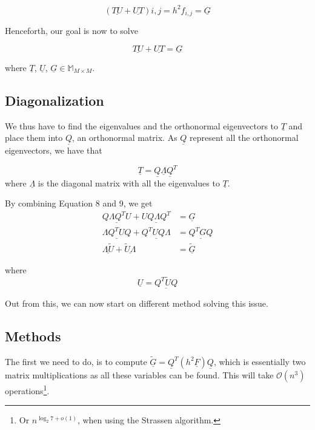 \begin{equation}
  (\underline{TU} + \underline{UT})i,j = h^2f_{i,j} = \underline{G}
\end{equation}

Henceforth, our goal is now to solve

\begin{equation}
  \underline{TU} + \underline{UT} = \underline G
\end{equation}

where $\underline T$, $\underline U$, $\underline G \in \mathbb{M}_{M\times M}$.

\subsection{Diagonalization}

We thus have to find the eigenvalues and the orthonormal eigenvectors to
$\underline T$ and place them into $\underline Q$, an orthonormal matrix. As
$\underline Q$ represent all the orthonormal eigenvectors, we have that

\begin{equation}
  \underline T = \underline Q \underline \Lambda \underline Q^T
\end{equation}
where $\underline \Lambda$ is the diagonal matrix with all the eigenvalues to
$\underline T$.

By combining Equation 8 and 9, we get
\begin{align}
  \underline {Q \Lambda Q^T U} + \underline {U Q \Lambda Q^T} &= \underline G \\
  \underline {\Lambda Q^T U Q} + \underline {Q^T U Q \Lambda} &= \underline{Q^T
    G Q} \\
  \underline {\Lambda \tilde{U}} + \underline {\tilde{U} \Lambda} &= \underline{\tilde{G}}
\end{align}

where
\begin{equation}
  \underline U = \underline{Q^T \tilde{U} Q}
\end{equation}

Out from this, we can now start on different method solving this issue.

\subsection{Methods}

The first we need to do, is to compute $\underline{\tilde{G}} = \underline Q^T
(h^2 \underline F) \underline Q$, which is essentially two matrix
multiplications as all these variables can be found. This will take
$\mathcal{O}(n^3)$ operations\footnote{Or $n^{\log_2 7 + o(1)}$, when using
  the Strassen algorithm.}.

